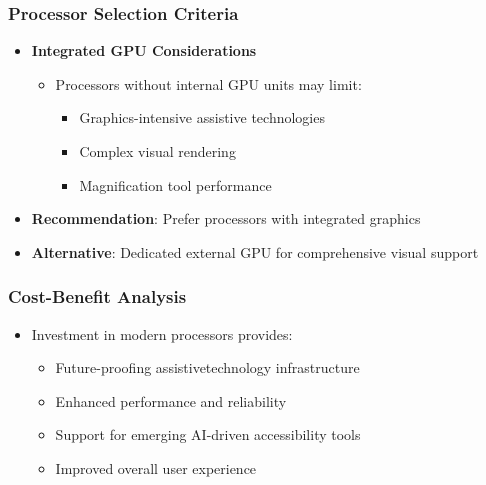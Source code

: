\subsubsection{Processor Selection Criteria}

\begin{itemize}
	\item \textbf{Integrated GPU Considerations}

	      \begin{itemize}
		      \item Processors without internal GPU units may limit:

		            \begin{itemize}
			            \item Graphics-intensive assistive technologies \supercite{GPUforAssistiveTech}
			            \item Complex visual rendering \supercite{GPUforAssistiveTech}
			            \item Magnification tool performance \supercite{GPUforAssistiveTech}
		            \end{itemize}

	      \end{itemize}

\end{itemize}

\begin{itemize}
	\item \textbf{Recommendation}: Prefer processors with integrated graphics \supercite{IntelIntegratedGraphics}
	\item \textbf{Alternative}: Dedicated external GPU for comprehensive visual support \supercite{ExternalGPUAssistiveTech}
\end{itemize}


\subsubsection{Cost-Benefit Analysis}

\begin{itemize}
	\item Investment in modern processors provides:
	      \begin{itemize}
		      \item Future-proofing \gls{assistivetechnology} infrastructure \supercite{FutureProofingTech}
		      \item Enhanced performance and reliability \supercite{ModernProcessorBenefits}
		      \item Support for emerging AI-driven accessibility tools \supercite{AIinAccessibility}
		      \item Improved overall user experience \supercite{UserExperienceImprovements}
	      \end{itemize}
\end{itemize}


